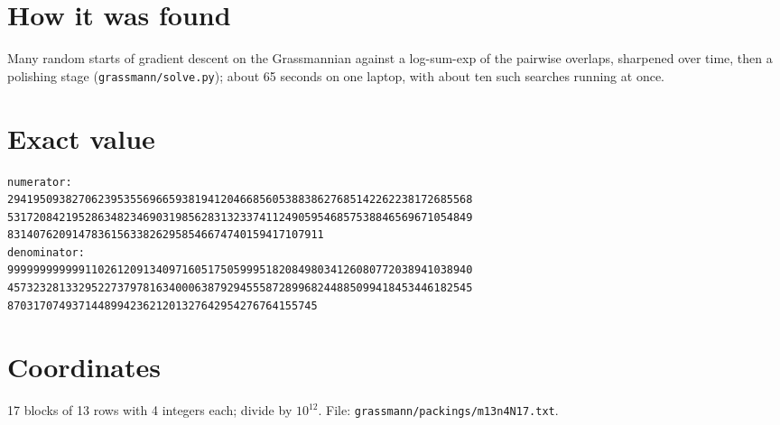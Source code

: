 \documentclass[11pt,a4paper]{article}
\begin{document}
\section{How it was found}
Many random starts of gradient descent on the Grassmannian against a log-sum-exp of the pairwise overlaps, sharpened over time, then a polishing stage (\texttt{grassmann/solve.py}); about 65 seconds on one laptop, with about ten such searches running at once.


\appendix
\section{Exact value}
{\small
\begin{verbatim}
numerator:
294195093827062395355696659381941204668560538838627685142262238172685568
531720842195286348234690319856283132337411249059546857538846569671054849
8314076209147836156338262958546674740159417107911
denominator:
999999999999110261209134097160517505999518208498034126080772038941038940
457323281332952273797816340006387929455587289968244885099418453446182545
870317074937144899423621201327642954276764155745
\end{verbatim}}

\section{Coordinates}
17 blocks of 13 rows with 4 integers each; divide by $10^{12}$. File: \texttt{grassmann/packings/m13n4N17.txt}.
{\tiny
\begin{multicols}{3}
\end{multicols}}
\end{document}
